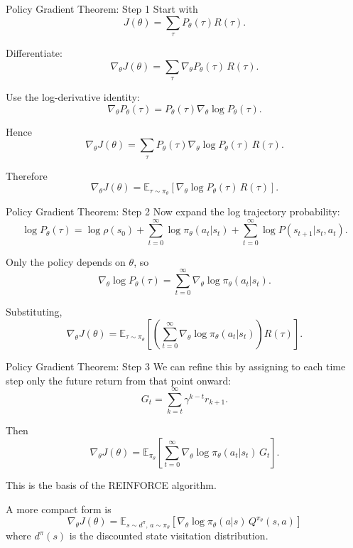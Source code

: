 \documentclass[aspectratio=169]{beamer}
\begin{document}
\begin{frame}{Policy Gradient Theorem: Step 1}
  Start with
  \[
  J(\theta)=\sum_\tau P_\theta(\tau)R(\tau).
  \]

  Differentiate:
  \[
  \nabla_\theta J(\theta)=\sum_\tau \nabla_\theta P_\theta(\tau)\,R(\tau).
  \]

  Use the log-derivative identity:
  \[
  \nabla_\theta P_\theta(\tau)=P_\theta(\tau)\nabla_\theta \log P_\theta(\tau).
  \]

  Hence
  \[
  \nabla_\theta J(\theta)=\sum_\tau P_\theta(\tau)\nabla_\theta \log P_\theta(\tau)\,R(\tau).
  \]

  Therefore
  \[
  \nabla_\theta J(\theta)=\mathbb{E}_{\tau\sim \pi_\theta}\left[\nabla_\theta \log P_\theta(\tau)\,R(\tau)\right].
  \]
\end{frame}

\begin{frame}{Policy Gradient Theorem: Step 2}
  Now expand the log trajectory probability:
  \[
  \log P_\theta(\tau)=\log \rho(s_0)+
  \sum_{t=0}^\infty \log \pi_\theta(a_t|s_t)+
  \sum_{t=0}^\infty \log P(s_{t+1}|s_t,a_t).
  \]

  Only the policy depends on $\theta$, so
  \[
  \nabla_\theta \log P_\theta(\tau)=
  \sum_{t=0}^\infty \nabla_\theta \log \pi_\theta(a_t|s_t).
  \]

  Substituting,
  \[
  \nabla_\theta J(\theta)=
  \mathbb{E}_{\tau\sim \pi_\theta}
  \left[
    \left(
    \sum_{t=0}^\infty \nabla_\theta \log \pi_\theta(a_t|s_t)
    \right)
    R(\tau)
    \right].
  \]
\end{frame}

\begin{frame}{Policy Gradient Theorem: Step 3}
  We can refine this by assigning to each time step only the future return from that point onward:
  \[
  G_t=\sum_{k=t}^\infty \gamma^{k-t}r_{k+1}.
  \]

  Then
  \[
  \nabla_\theta J(\theta)=
  \mathbb{E}_{\pi_\theta}
  \left[
    \sum_{t=0}^\infty \nabla_\theta \log \pi_\theta(a_t|s_t)\,G_t
    \right].
  \]

  This is the basis of the REINFORCE algorithm.

  A more compact form is
  \[
  \nabla_\theta J(\theta)=
  \mathbb{E}_{s\sim d^\pi,\,a\sim \pi_\theta}
  \left[
    \nabla_\theta \log \pi_\theta(a|s)\,Q^{\pi_\theta}(s,a)
    \right]
  \]
  where $d^\pi(s)$ is the discounted state visitation distribution.
\end{frame}
\end{document}
